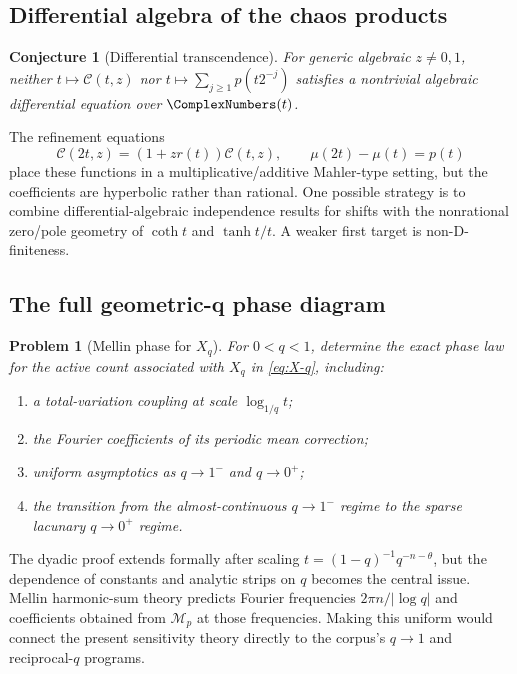 \documentclass[11pt,oneside]{article}
\newtheorem{conjecture}[theorem]{Conjecture}
\newtheorem{problem}[theorem]{Problem}
\theoremstyle{definition}
\theoremstyle{remark}
\newcommand{\Ccal}{\mathcal C}
\newcommand{\Mcal}{\mathcal M}
\begin{document}
\subsection{Differential algebra of the chaos products}

\begin{conjecture}[Differential transcendence]
\label{conj:differential-transcendence}
For generic algebraic $z\ne0,1$, neither $t\mapsto\Ccal(t,z)$ nor
$t\mapsto\sum_{j\ge1}p(t2^{-j})$ satisfies a nontrivial algebraic differential
equation over $\ComplexNumbers(t)$.
\end{conjecture}

The refinement equations
\[
 \Ccal(2t,z)=(1+zr(t))\Ccal(t,z),
 \qquad
 \mu(2t)-\mu(t)=p(t)
\]
place these functions in a multiplicative/additive Mahler-type setting, but
the coefficients are hyperbolic rather than rational.  One possible strategy
is to combine differential-algebraic independence results for shifts with the
nonrational zero/pole geometry of $\coth t$ and $\tanh t/t$.  A weaker first
target is non-D-finiteness.

\subsection{The full geometric-q phase diagram}

\begin{problem}[Mellin phase for $X_q$]
\label{prob:q-phase}
For $0<q<1$, determine the exact phase law for the active count associated
with $X_q$ in \eqref{eq:X-q}, including:
\begin{enumerate}
\item a total-variation coupling at scale $\log_{1/q}t$;
\item the Fourier coefficients of its periodic mean correction;
\item uniform asymptotics as $q\to1^-$ and $q\to0^+$;
\item the transition from the almost-continuous $q\to1^-$ regime to the sparse
      lacunary $q\to0^+$ regime.
\end{enumerate}
\end{problem}

The dyadic proof extends formally after scaling
$t=(1-q)^{-1}q^{-n-\theta}$, but the dependence of constants and analytic
strips on $q$ becomes the central issue.  Mellin harmonic-sum theory predicts
Fourier frequencies $2\pi n/|\log q|$ and coefficients obtained from
$\Mcal_p$ at those frequencies.  Making this uniform would connect the
present sensitivity theory directly to the corpus's $q\to1$ and reciprocal-$q$
programs.
\end{document}
